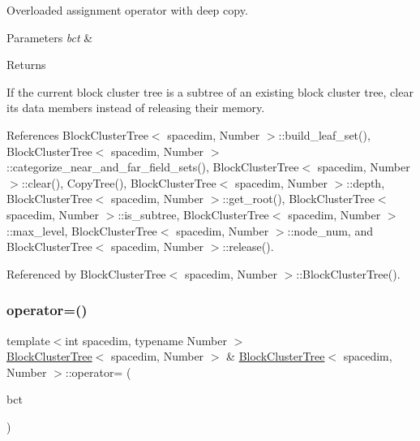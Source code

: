 Overloaded assignment operator with deep copy. 
\begin{DoxyParams}{Parameters}
{\em bct} & \\
\hline
\end{DoxyParams}
\begin{DoxyReturn}{Returns}

\end{DoxyReturn}
If the current block cluster tree is a subtree of an existing block cluster tree, clear its data members instead of releasing their memory.

References Block\+Cluster\+Tree$<$ spacedim, Number $>$\+::build\+\_\+leaf\+\_\+set(), Block\+Cluster\+Tree$<$ spacedim, Number $>$\+::categorize\+\_\+near\+\_\+and\+\_\+far\+\_\+field\+\_\+sets(), Block\+Cluster\+Tree$<$ spacedim, Number $>$\+::clear(), Copy\+Tree(), Block\+Cluster\+Tree$<$ spacedim, Number $>$\+::depth, Block\+Cluster\+Tree$<$ spacedim, Number $>$\+::get\+\_\+root(), Block\+Cluster\+Tree$<$ spacedim, Number $>$\+::is\+\_\+subtree, Block\+Cluster\+Tree$<$ spacedim, Number $>$\+::max\+\_\+level, Block\+Cluster\+Tree$<$ spacedim, Number $>$\+::node\+\_\+num, and Block\+Cluster\+Tree$<$ spacedim, Number $>$\+::release().



Referenced by Block\+Cluster\+Tree$<$ spacedim, Number $>$\+::\+Block\+Cluster\+Tree().

\mbox{\label{classBlockClusterTree_aa635be81dfabed3ba455a17de3b65c2e}} 
\subsubsection{\texorpdfstring{operator=()}{operator=()}\hspace{0.1cm}{\footnotesize\ttfamily [2/2]}}
{\footnotesize\ttfamily template$<$int spacedim, typename Number $>$ \\
\hyperlink{classBlockClusterTree}{Block\+Cluster\+Tree}$<$ spacedim, Number $>$ \& \hyperlink{classBlockClusterTree}{Block\+Cluster\+Tree}$<$ spacedim, Number $>$\+::operator= (\begin{DoxyParamCaption}\item[{\hyperlink{classBlockClusterTree}{Block\+Cluster\+Tree}$<$ spacedim, Number $>$ \&\&}]{bct }\end{DoxyParamCaption})}

